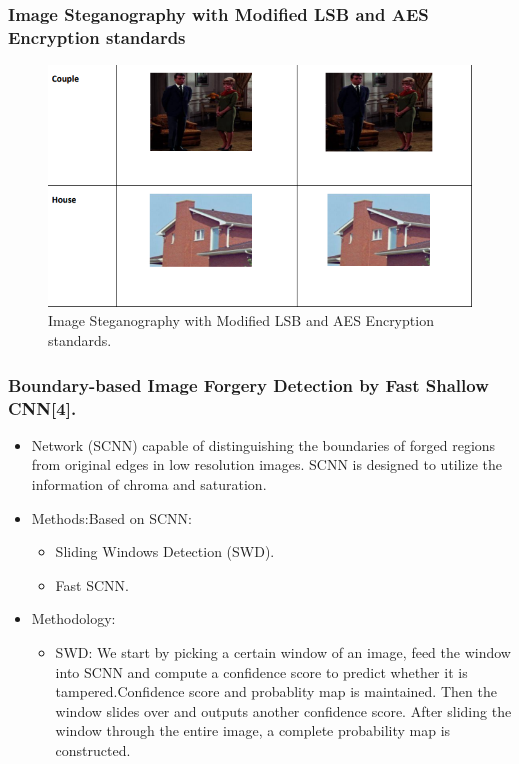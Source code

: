 \documentclass{beamer} %
\theoremstyle{definition} %
\begin{document}
\begin{frame}
 \frametitle{Image Steganography with Modified LSB and AES Encryption standards}
	\begin{figure}
		\includegraphics[scale=0.5]{modifiedLSB.png}
		\caption{Image Steganography with Modified LSB and AES Encryption standards.}
	\end{figure}
\end{frame}
\begin{frame}
\frametitle{Boundary-based Image Forgery Detection by Fast Shallow CNN[4]. }
\begin{itemize}
	\item{ Network (SCNN) capable of distinguishing the boundaries of
		forged regions from original edges in low resolution images.
		SCNN is designed to utilize the information of chroma and
		saturation.}
	\item{Methods:Based on SCNN:}
	\begin{itemize}
		\item Sliding Windows Detection (SWD).
		\item Fast SCNN.
	\end{itemize}
	\item {Methodology:}
	\begin{itemize}
		\item{SWD: We start by picking a certain window of an image, feed the window into SCNN and compute a confidence score to predict whether it is tampered.Confidence score and probablity map is maintained. Then the window slides over and outputs another confidence score. After sliding the window through the entire image, a complete probability map is constructed.}
    \end{itemize}
\end{itemize}
\end{frame}
\end{document}
